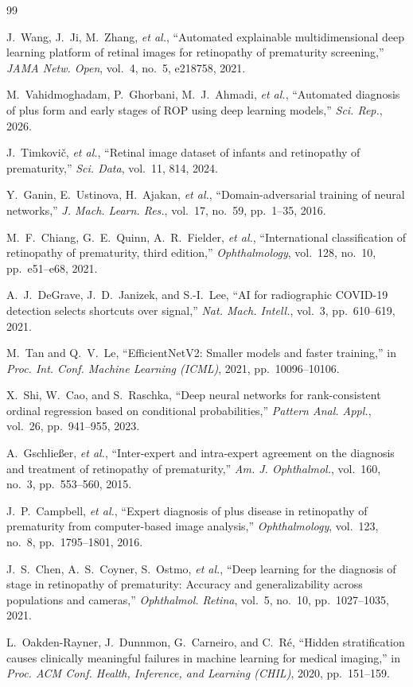 \documentclass{article}
\begin{document}
\begin{thebibliography}{99}

J.~Wang, J.~Ji, M.~Zhang, \emph{et al.},
``Automated explainable multidimensional deep learning platform of retinal images
for retinopathy of prematurity screening,''
\emph{JAMA Netw. Open}, vol.~4, no.~5, e218758, 2021.

M.~Vahidmoghadam, P.~Ghorbani, M.~J.~Ahmadi, \emph{et al.},
``Automated diagnosis of plus form and early stages of ROP using deep learning
models,''
\emph{Sci. Rep.}, 2026.

J.~Timkovi\v{c}, \emph{et al.},
``Retinal image dataset of infants and retinopathy of prematurity,''
\emph{Sci. Data}, vol.~11, 814, 2024.

Y.~Ganin, E.~Ustinova, H.~Ajakan, \emph{et al.},
``Domain-adversarial training of neural networks,''
\emph{J. Mach. Learn. Res.}, vol.~17, no.~59, pp.~1--35, 2016.

M.~F.~Chiang, G.~E.~Quinn, A.~R.~Fielder, \emph{et al.},
``International classification of retinopathy of prematurity, third edition,''
\emph{Ophthalmology}, vol.~128, no.~10, pp.~e51--e68, 2021.

A.~J.~DeGrave, J.~D.~Janizek, and S.-I.~Lee,
``AI for radiographic COVID-19 detection selects shortcuts over signal,''
\emph{Nat. Mach. Intell.}, vol.~3, pp.~610--619, 2021.

M.~Tan and Q.~V.~Le,
``EfficientNetV2: Smaller models and faster training,''
in \emph{Proc. Int. Conf. Machine Learning (ICML)}, 2021, pp.~10096--10106.

X.~Shi, W.~Cao, and S.~Raschka,
``Deep neural networks for rank-consistent ordinal regression based on
conditional probabilities,''
\emph{Pattern Anal. Appl.}, vol.~26, pp.~941--955, 2023.

A.~Gschlie{\ss}er, \emph{et al.},
``Inter-expert and intra-expert agreement on the diagnosis and treatment of
retinopathy of prematurity,''
\emph{Am. J. Ophthalmol.}, vol.~160, no.~3, pp.~553--560, 2015.

J.~P.~Campbell, \emph{et al.},
``Expert diagnosis of plus disease in retinopathy of prematurity from
computer-based image analysis,''
\emph{Ophthalmology}, vol.~123, no.~8, pp.~1795--1801, 2016.

J.~S.~Chen, A.~S.~Coyner, S.~Ostmo, \emph{et al.},
``Deep learning for the diagnosis of stage in retinopathy of prematurity:
Accuracy and generalizability across populations and cameras,''
\emph{Ophthalmol. Retina}, vol.~5, no.~10, pp.~1027--1035, 2021.

L.~Oakden-Rayner, J.~Dunnmon, G.~Carneiro, and C.~R\'e,
``Hidden stratification causes clinically meaningful failures in machine learning
for medical imaging,''
in \emph{Proc. ACM Conf. Health, Inference, and Learning (CHIL)}, 2020,
pp.~151--159.

\end{thebibliography}
\end{document}
